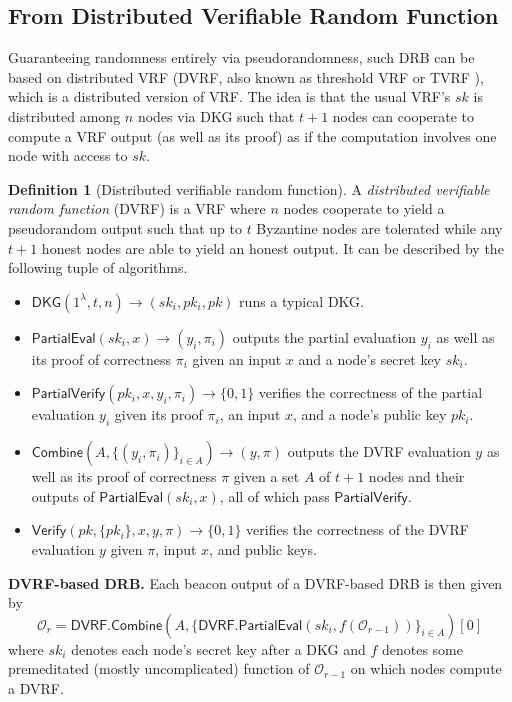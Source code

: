 \documentclass[conference]{IEEEtran}
\theoremstyle{definition}
\newtheorem{definition}[theorem]{Definition}
\theoremstyle{remark}
\begin{document}
\subsection{From Distributed Verifiable Random Function}
Guaranteeing randomness entirely via pseudorandomness, such DRB can be based on distributed VRF \cite{hanke2018dfinity,galindo2020fully} (DVRF, also known as threshold VRF or TVRF \cite{cascudomt}), which is a distributed version of VRF. The idea is that the usual VRF's $sk$ is distributed among $n$ nodes via DKG such that $t + 1$ nodes can cooperate to compute a VRF output (as well as its proof) as if the computation involves one node with access to $sk$.

\begin{definition}[Distributed verifiable random function]
A \textit{distributed verifiable random function} (DVRF) is a VRF where $n$ nodes cooperate to yield a pseudorandom output such that up to $t$ Byzantine nodes are tolerated while any $t + 1$ honest nodes are able to yield an honest output. It can be described by the following tuple of algorithms.
\begin{itemize}
\item $\mathsf{DKG}(1^\lambda, t, n) \rightarrow (sk_i, pk_i, pk)$ runs a typical DKG.
\item $\mathsf{PartialEval}(sk_i, x) \rightarrow (y_i, \pi_i)$ outputs the partial evaluation $y_i$ as well as its proof of correctness $\pi_i$ given an input $x$ and a node's secret key $sk_i$.
\item $\mathsf{PartialVerify}(pk_i, x, y_i, \pi_i) \rightarrow \{0, 1\}$ verifies the correctness of the partial evaluation $y_i$ given its proof $\pi_i$, an input $x$, and a node's public key $pk_i$.
\item $\mathsf{Combine}(A, \{(y_i, \pi_i)\}_{i \in A}) \rightarrow (y, \pi)$ outputs the DVRF evaluation $y$ as well as its proof of correctness $\pi$ given a set $A$ of $t + 1$ nodes and their outputs of $\mathsf{PartialEval}(sk_i, x)$, all of which pass $\mathsf{PartialVerify}$.
\item $\mathsf{Verify}(pk, \{pk_i\}, x, y, \pi) \rightarrow \{0, 1\}$ verifies the correctness of the DVRF evaluation $y$ given $\pi$, input $x$, and public keys.
\end{itemize}
\end{definition}

\noindent\textbf{DVRF-based DRB.} Each beacon output of a DVRF-based DRB is then given by
\begingroup\makeatletter\def\f@size{8}\check@mathfonts
\[
\mathcal{O}_r = \mathsf{DVRF.Combine}(A, \{\mathsf{DVRF.PartialEval}(sk_i, f(\mathcal{O}_{r - 1}))\}_{i \in A})[0]
\]\endgroup
where $sk_i$ denotes each node's secret key after a DKG and $f$ denotes some premeditated (mostly uncomplicated) function of $\mathcal{O}_{r - 1}$ on which nodes compute a DVRF.
\end{document}

